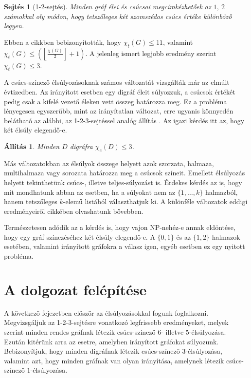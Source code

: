 \documentclass[12pt, a4paper]{report}
\newtheorem{áll}[tét]{Állítás}
\newtheorem{sej}[tét]{Sejtés}
\theoremstyle{remark}
\theoremstyle{definition}
\begin{document}
\begin{sej}[1-2-sejtés]
Minden gráf élei és csúcsai megcímkézhetőek az $1,\ 2$ számokkal oly módon, hogy tetszőleges két szomszédos csúcs értéke különböző legyen.
\end{sej}

Ebben a cikkben bebizonyították, hogy $\chi_t(G) \leq 11$, valamint $\chi_t(G) \leq \left( \left\lfloor \frac{χ(G)}{2} \right\rfloor + 1 \right)$. A jelenleg ismert legjobb eredmény szerint $\chi_t(G) \leq 3$.

A csúcs-színező élsúlyozásoknak számos változatát vizsgálták már az elmúlt évtizedben. Az irányított esetben egy digráf éleit súlyozzuk, a csúcsok értékét pedig csak a kifelé vezető éleken vett összeg határozza meg. Ez a probléma lényegesen egyszerűbb, mint az irányítatlan változat, erre ugyanis könnyedén belátható az alábbi, az 1-2-3-sejtéssel analóg állítás \cite{Baudon2014}. Az igazi kérdés itt az, hogy két élsúly elegendő-e.

\begin{áll}
Minden $D$ digráfra $\chi_e(D) \leq 3$.
\end{áll}

Más változatokban az élsúlyok összege helyett azok szorzata, halmaza, multihalmaza vagy sorozata határozza meg a csúcsok színeit. Emellett élsúlyozás helyett tekinthetünk csúcs-, illetve teljes-súlyozást is. Érdekes kérdés az is, hogy mit mondhatunk abban az esetben, ha a súlyokat nem az $\lbrace 1, \ldots, k \rbrace$ halmazból, hanem tetszőleges $k$-elemű listából választhatjuk ki. A különféle változatok eddigi eredményeiről \citeauthor{Seamone2012} \cite{Seamone2012} cikkében olvashatunk bővebben.

Természetesen adódik az a kérdés is, hogy vajon NP-nehéz-e annak eldöntése, hogy egy gráf színezéséhez két élsúly elegendő-e. A $\lbrace 0, 1 \rbrace$ és az $\lbrace 1, 2 \rbrace$ halmazok esetében, valamint irányított gráfokra a válasz igen, egyéb esetben ez egy nyitott probléma.

\section{A dolgozat felépítése}

A következő fejezetben először az élsúlyozásokkal fogunk foglalkozni. Megvizsgáljuk az 1-2-3-sejtésre vonatkozó legfrissebb eredményeket, melyek szerint minden rendes gráfnak létezik csúcs-színező $6$- illetve $5$-élsúlyozása. Ezután kitérünk arra az esetre, amelyben irányított gráfokat súlyozunk. Bebizonyítjuk, hogy minden digráfnak létezik csúcs-színező $3$-élsúlyozása, valamint azt, hogy minden gráfnak van olyan irányítása, amelynek létezik csúcs-színező $1$-élsúlyozása.
\end{document}
